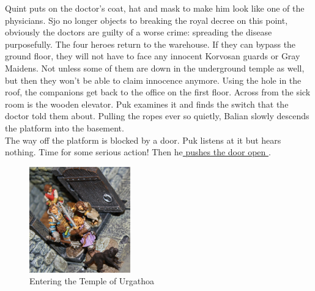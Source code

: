 Quint puts on the doctor's coat, hat and mask to make him look like one of the physicians. Sjo no longer objects to breaking the royal decree on this point, obviously the doctors are guilty of a worse crime: spreading the disease purposefully. The four heroes return to the warehouse. If they can bypass the ground floor, they will not have to face any innocent Korvosan guards or Gray Maidens. Not unless some of them are down in the underground temple as well, but then they won't be able to claim innocence anymore. Using the hole in the roof, the companions get back to the office on the first floor. Across from the sick room is the wooden elevator. Puk examines it and finds the switch that the doctor told them about. Pulling the ropes ever so quietly, Balian slowly descends the platform into the basement.\\

The way off the platform is blocked by a door. Puk listens at it but hears nothing. Time for some serious action! Then he\hyperref[fig:Entering-the-Temple-of-Urgathoa-516987053]{ pushes the door open } . \\

\begin{figure}[h]
	\centering
	\includegraphics[width=0.39\textwidth]{images/Entering-the-Temple-of-Urgathoa-516987053.jpg}
	\caption{Entering the Temple of Urgathoa}
	\label{fig:Entering-the-Temple-of-Urgathoa-516987053}
\end{figure}

